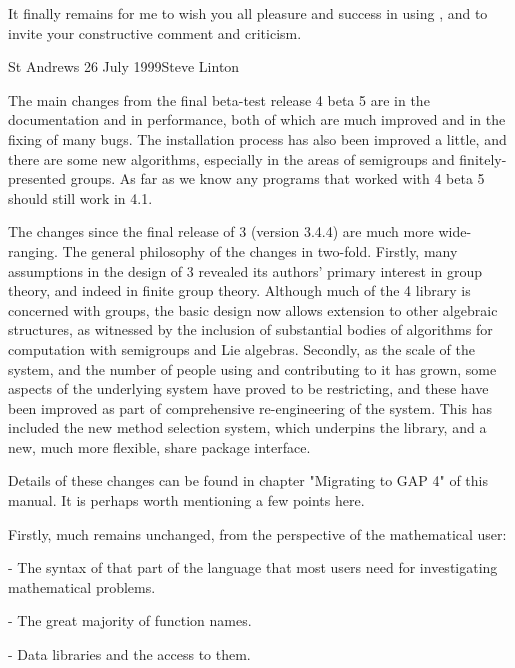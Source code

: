 It finally remains  for me to wish you  all pleasure and success in using
{\GAP}, and to invite your constructive comment and criticism.

St Andrews 26 July 1999\hfill Steve Linton



The main changes from the final beta-test release {\GAP}  4 beta 5 are in
the documentation and in performance, both of which are much improved and
in the   fixing of many  bugs. The  installation  process  has  also been
improved a  little, and there are  some new algorithms, especially in the
areas of semigroups and finitely-presented groups.  As far as we know any
programs that worked with 4 beta 5 should still work in {\GAP} 4.1.

The changes since the final release of  {\GAP} 3 (version 3.4.4) are much
more wide-ranging.   The general philosophy  of  the changes in two-fold.
Firstly, many assumptions in the design of {\GAP} 3 revealed its authors'
primary  interest    in  group  theory,  and  indeed     in  finite group
theory. Although much of the  {\GAP} 4 library  is concerned with groups,
the basic  design now allows extension  to other algebraic structures, as
witnessed  by   the inclusion of   substantial  bodies of  algorithms for
computation with semigroups and Lie  algebras.  Secondly, as the scale of
the  system, and the  number of people  using and contributing  to it has
grown, some   aspects of  the   underlying   system have  proved   to  be
restricting,  and   these have  been  improved as  part  of comprehensive
re-engineering of the system. This has  included the new method selection
system, which underpins the library, and a new, much more flexible, share
package interface.

Details of these changes can be found in chapter "Migrating to GAP 4" of
this manual. It is perhaps worth mentioning a few points here. 

Firstly, much remains unchanged, from the perspective of the mathematical 
user:

\beginlist
  \item{-}
    The syntax of that part  of the {\GAP} language  that most users need
    for investigating mathematical problems.

  \item{-}
    The great majority of function names.

  \item{-}
    Data libraries and the access to them.
\endlist

